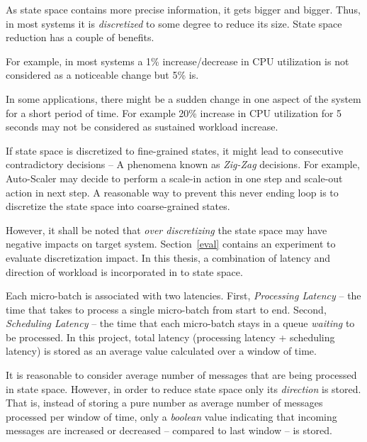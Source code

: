 As state space contains more precise information, it gets bigger and bigger. Thus, in most systems it is \emph{discretized} to some degree to reduce its size. State space reduction has a couple of benefits.
\begin{description}[leftmargin=0pt]
    \item[Change Observation] For example, in most systems a 1\% increase/decrease in CPU utilization is not considered as a noticeable change but 5\% is.
    \item[Absorbing Sudden Bursts] In some applications, there might be a sudden change in one aspect of the system for a short period of time. For example 20\% increase in CPU utilization for 5 seconds may not be considered as sustained workload increase.
    \item[Preventing Zig-Zag Decisions] If state space is discretized to fine-grained states, it might lead to consecutive contradictory decisions -- A phenomena known as \emph{Zig-Zag} decisions. For example, Auto-Scaler may decide to perform a scale-in action in one step and scale-out action in next step. A reasonable way to prevent this never ending loop is to discretize the state space into coarse-grained states.
\end{description}
However, it shall be noted that \emph{over discretizing} the state space may have negative impacts on target system. Section~\ref{eval} contains an experiment to evaluate discretization impact. In this thesis, a combination of latency and direction of workload is incorporated in to state space.
\begin{description}[leftmargin=0pt]
    \item[Latency] Each micro-batch is associated with two latencies. First, \emph{Processing Latency} -- the time that takes to process a single micro-batch from start to end. Second, \emph{Scheduling Latency} -- the time that each micro-batch stays in a queue \emph{waiting} to be processed. In this project, total latency (processing latency + scheduling latency) is stored as an average value calculated over a window of time.
    \item[Workload Direction] It is reasonable to consider average number of messages that are being processed in state space. However, in order to reduce state space only its \emph{direction} is stored. That is, instead of storing a pure number as average number of messages processed per window of time, only a \emph{boolean} value indicating that incoming messages are increased or decreased -- compared to last window -- is stored.
\end{description}

